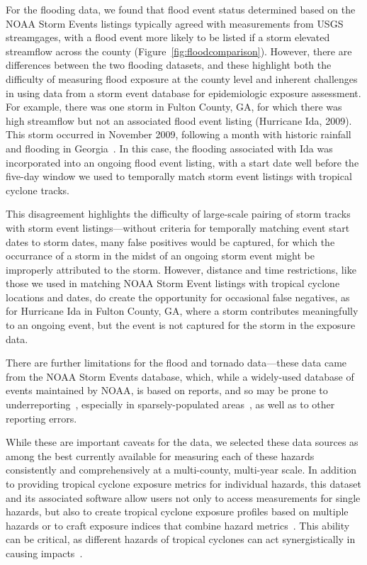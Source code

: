 For the flooding data, we found that flood event status determined based on the
NOAA Storm Events listings typically agreed with measurements from \ac{USGS}
streamgages, with a flood event more likely to be listed if a storm elevated
streamflow across the county (Figure~\ref{fig:floodcomparison}).  However,
there are differences between the two flooding datasets, and these highlight
both the difficulty of measuring flood exposure at the county level and
inherent challenges in using data from a storm event database for epidemiologic
exposure assessment.  For example, there was one storm in Fulton County, GA,
for which there was high streamflow but not an associated flood event listing
(Hurricane Ida, 2009).  This storm occurred in November 2009, following a month
with historic rainfall and flooding in
Georgia~\parencite{shepherd2011overview}.  In this case, the flooding
associated with Ida was incorporated into an ongoing flood event listing, with
a start date well before the five-day window we used to temporally match storm
event listings with tropical cyclone tracks. 

This disagreement highlights the difficulty of large-scale pairing of storm
tracks with storm event listings---without criteria for temporally matching
event start dates to storm dates, many false positives would be
captured, for which the occurrance of a storm in the midst of an ongoing storm
event might be improperly attributed to the storm.  However, distance
and time restrictions, like those we used in matching NOAA Storm Event listings
with tropical cyclone locations and dates, do create the opportunity for
occasional false negatives, as for Hurricane Ida in Fulton County, GA, where a
storm contributes meaningfully to an ongoing event, but the event is not
captured for the storm in the exposure data.  

There are further limitations for the flood and tornado data---these data came
from the \ac{NOAA} Storm Events database, which, while a widely-used database
of events maintained by \ac{NOAA}, is based on reports, and so may be prone to
underreporting~\parencite{Ashley2008flood, Curran2000}, especially in
sparsely-populated areas~\parencite{Witt1998, Ashley2007}, as well as to other
reporting errors. 

While these are important caveats for the data, we selected these data sources
as among the best currently available for measuring each of these hazards
consistently and comprehensively at a multi-county, multi-year scale. In
addition to providing tropical cyclone exposure metrics for individual hazards,
this dataset and its associated software allow users not only to access
measurements for single hazards, but also to create tropical cyclone exposure
profiles based on multiple hazards or to craft exposure indices that combine
hazard metrics~\parencite{chakraborty2005population, peduzzi2009assessing}.
This ability can be critical, as different hazards of tropical cyclones can
act synergistically in causing impacts~\parencite{smith2009}.  


